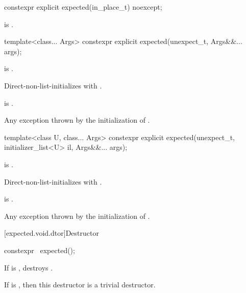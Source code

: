 %
\begin{itemdecl}
constexpr explicit expected(in_place_t) noexcept;
\end{itemdecl}

\begin{itemdescr}
\pnum
\ensures
{} is .
\end{itemdescr}

%
\begin{itemdecl}
template<class... Args>
  constexpr explicit expected(unexpect_t, Args&&... args);
\end{itemdecl}

\begin{itemdescr}
\pnum
\constraints
{} is .

\pnum
\effects
Direct-non-list-initializes 
with .

\pnum
\ensures
{} is .

\pnum
\throws
Any exception thrown by the initialization of .
\end{itemdescr}

%
\begin{itemdecl}
template<class U, class... Args>
    constexpr explicit expected(unexpect_t, initializer_list<U> il, Args&&... args);
\end{itemdecl}

\begin{itemdescr}
\pnum
\constraints
{} is .

\pnum
\effects
Direct-non-list-initializes 
with .

\pnum
\ensures
{} is .

\pnum
\throws
Any exception thrown by the initialization of .
\end{itemdescr}

[expected.void.dtor]{Destructor}

%
\begin{itemdecl}
constexpr ~expected();
\end{itemdecl}

\begin{itemdescr}
\pnum
\effects
If  is , destroys .

\pnum
\remarks
If  is ,
then this destructor is a trivial destructor.
\end{itemdescr}

